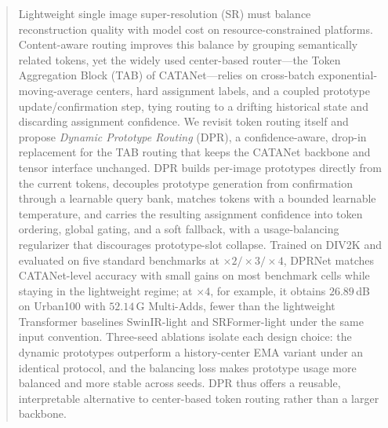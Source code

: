 \begin{abstract}
Lightweight single image super-resolution (SR) must balance reconstruction quality with
model cost on resource-constrained platforms. Content-aware routing improves this balance
by grouping semantically related tokens, yet the widely used center-based router---the
Token Aggregation Block (TAB) of CATANet---relies on cross-batch exponential-moving-average
centers, hard assignment labels, and a coupled prototype update/confirmation step, tying
routing to a drifting historical state and discarding assignment confidence. We revisit
token routing itself and propose \emph{Dynamic Prototype Routing} (DPR), a confidence-aware,
drop-in replacement for the TAB routing that keeps the CATANet backbone and tensor interface
unchanged. DPR builds per-image prototypes directly
from the current tokens, decouples prototype generation from confirmation through a
learnable query bank, matches tokens with a bounded learnable temperature, and carries the
resulting assignment confidence into token ordering, global gating, and a soft fallback,
with a usage-balancing regularizer that discourages prototype-slot collapse. Trained on
DIV2K and evaluated on five standard benchmarks at $\times2/\times3/\times4$, DPRNet matches
CATANet-level accuracy with small gains on most benchmark cells while staying in the
lightweight regime; at $\times4$, for example, it obtains $26.89$\,dB on Urban100 with
$52.14$\,G Multi-Adds, fewer than the lightweight Transformer baselines SwinIR-light and
SRFormer-light under the same input convention. Three-seed ablations isolate each design
choice: the dynamic prototypes outperform a history-center EMA variant under an identical
protocol, and the balancing loss makes prototype usage more balanced and more stable across
seeds. DPR thus offers a reusable, interpretable alternative to center-based token routing
rather than a larger backbone.
\end{abstract}
